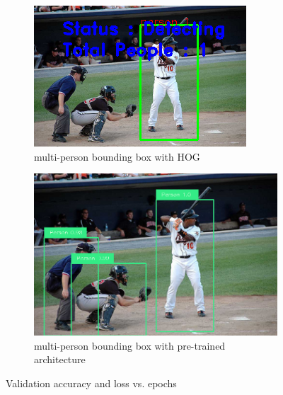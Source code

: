 \documentclass[11pt, letterpaper]{article}
\begin{document}
\begin{figure}[h]
    \centering
    \begin{subfigure}{0.4\textwidth}
        \centering
        \includegraphics[width=0.8\linewidth]{multi-person_HOG_bbox.png}
        \caption{multi-person bounding box with HOG}
    \end{subfigure}
    \begin{subfigure}{0.4\textwidth}
        \centering
        \includegraphics[width=0.8\linewidth]{multi-person_pre-trained_bbox.png}
        \caption{multi-person bounding box with pre-trained architecture}
    \end{subfigure}
    \caption{Validation accuracy and loss vs. epochs}
    \label{fig:multi_person_results}
\end{figure}
\end{document}
